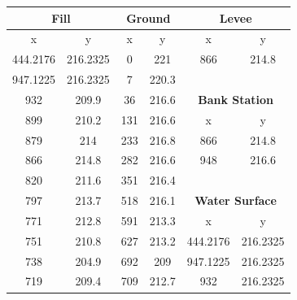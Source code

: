 \begin{center}
\begin{tabular}{|cc||cc||cc|} 
    \hline
    \multicolumn{2}{|c||}{\textbf{Fill}} & \multicolumn{2}{c||}{\textbf{Ground}} & \multicolumn{2}{c|}{\textbf{Levee}}           \\ 
    \hline
    x        & y                        & x    & y                             & x        & y                                  \\
    444.2176 & 216.2325                 & 0    & 221                           & 866      & 214.8                              \\
    947.1225 & 216.2325                 & 7    & 220.3                         &          &                                    \\
    932      & 209.9                    & 36   & 216.6                         & \multicolumn{2}{c|}{\textbf{Bank Station}}    \\ 
    \cline{5-6}
    899      & 210.2                    & 131  & 216.6                         & x        & y                                  \\
    879      & 214                      & 233  & 216.8                         & 866      & 214.8                              \\
    866      & 214.8                    & 282  & 216.6                         & 948      & 216.6                              \\
    820      & 211.6                    & 351  & 216.4                         &          &                                    \\
    797      & 213.7                    & 518  & 216.1                         & \multicolumn{2}{c|}{\textbf{Water Surface}}   \\ 
    \cline{5-6}
    771      & 212.8                    & 591  & 213.3                         & x        & y                                  \\
    751      & 210.8                    & 627  & 213.2                         & 444.2176 & 216.2325                           \\
    738      & 204.9                    & 692  & 209                           & 947.1225 & 216.2325                           \\
    719      & 209.4                    & 709  & 212.7                         & 932      & 216.2325                           \\

\end{tabular}
\end{center}
